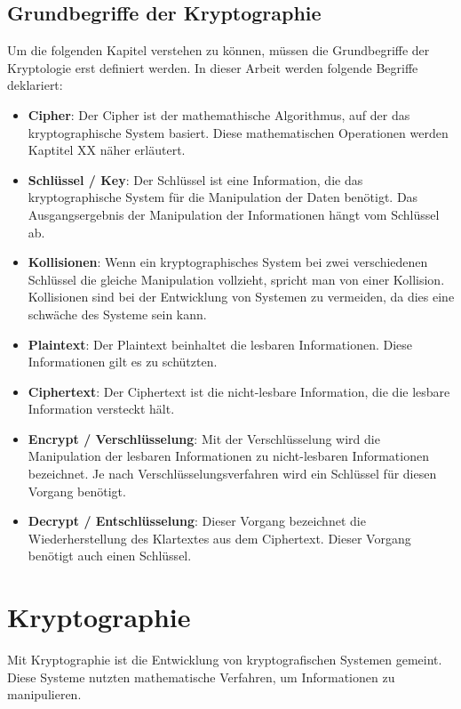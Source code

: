\documentclass[12pt,a4paper]{report}
\begin{document}
\subsection{Grundbegriffe der Kryptographie}

Um die folgenden Kapitel verstehen zu können, müssen die Grundbegriffe der Kryptologie erst definiert werden. In dieser Arbeit werden folgende Begriffe deklariert:

\begin{itemize}
\item \textbf{Cipher}: Der Cipher ist der mathemathische Algorithmus, auf der das kryptographische System basiert. Diese mathematischen Operationen werden Kaptitel XX näher erläutert.
\item \textbf{Schlüssel / Key}: Der Schlüssel ist eine Information, die das kryptographische System für die Manipulation der Daten benötigt.  Das Ausgangsergebnis der Manipulation der Informationen hängt vom Schlüssel ab.
\item \textbf{Kollisionen}: Wenn ein kryptographisches System bei zwei verschiedenen Schlüssel die gleiche Manipulation vollzieht, spricht man von einer Kollision. Kollisionen sind bei der Entwicklung von Systemen zu vermeiden, da dies eine schwäche des Systeme sein kann.
\item \textbf{Plaintext}: Der Plaintext beinhaltet die lesbaren Informationen. Diese Informationen gilt es zu schützten.
\item \textbf{Ciphertext}: Der Ciphertext ist die nicht-lesbare Information, die die lesbare Information versteckt hält.
\item \textbf{Encrypt / Verschlüsselung}: Mit der Verschlüsselung wird die Manipulation der lesbaren Informationen zu nicht-lesbaren Informationen bezeichnet. Je nach Verschlüsselungsverfahren wird ein Schlüssel für diesen Vorgang benötigt.
\item \textbf{Decrypt / Entschlüsselung}: Dieser Vorgang bezeichnet die Wiederherstellung des Klartextes aus dem Ciphertext. Dieser Vorgang benötigt auch einen Schlüssel.
\end{itemize}

\section{Kryptographie}

Mit Kryptographie ist die Entwicklung von kryptografischen Systemen gemeint. Diese Systeme nutzten mathematische Verfahren, um Informationen zu manipulieren. 
\end{document}
